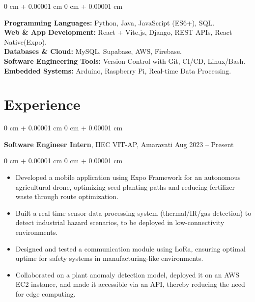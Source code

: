 \documentclass[10pt, letterpaper]{article}
\newenvironment{highlights}{ \begin{itemize}[ topsep=0.10 cm, parsep=0.10 cm, partopsep=0pt,
itemsep=0pt, leftmargin=0 cm + 10pt ] }{ \end{itemize} } %
\newenvironment{onecolentry}{ \begin{adjustwidth}{ 0 cm + 0.00001 cm }{ 0 cm + 0.00001 cm }
}{ \end{adjustwidth} } %
\newenvironment{twocolentry}[2][]{ \onecolentry \def\secondColumn{#2} \setcolumnwidth{\fill, 4.5 cm}
\begin{paracol}{2} }{ \switchcolumn \raggedleft \secondColumn \end{paracol}
\endonecolentry } %
\begin{document}
\begin{onecolentry}
    \textbf{Programming Languages:} Python, Java, JavaScript (ES6+), SQL.\\
    \vspace{0.10 cm}
    \textbf{Web \& App Development:} React + Vite.js, Django, REST APIs, React Native(Expo). \\
    \vspace{0.10 cm}
    \textbf{Databases \& Cloud:} MySQL, Supabase, AWS, Firebase. \\
    \vspace{0.10 cm}
    \textbf{Software Engineering Tools:} Version Control with Git, CI/CD, Linux/Bash.\\
    \vspace{0.10 cm}
    \textbf{Embedded Systems:} Arduino, Raspberry Pi, Real-time Data Processing.  \\
\end{onecolentry}



	\section{Experience}

\begin{twocolentry}
    { Aug 2023 – Present } \textbf{Software Engineer Intern}, IIEC VIT-AP, Amaravati
\end{twocolentry}

\begin{onecolentry}
    \begin{highlights}
    \vspace{0.10 cm}
        \item Developed a mobile application using Expo Framework for an autonomous agricultural drone, optimizing seed-planting paths and reducing fertilizer waste through route optimization. \\
        \item Built a real-time sensor data processing system (thermal/IR/gas detection) to detect industrial hazard scenarios, to be deployed in low-connectivity environments. \\
        \item Designed and tested a communication module using LoRa, ensuring optimal uptime for safety systems in manufacturing-like environments. \\
        \item Collaborated on a plant anomaly detection model, deployed it on an AWS EC2 instance, and made it accessible via an API, thereby reducing the need for edge computing.
    \end{highlights}
\end{onecolentry}
\end{document}
